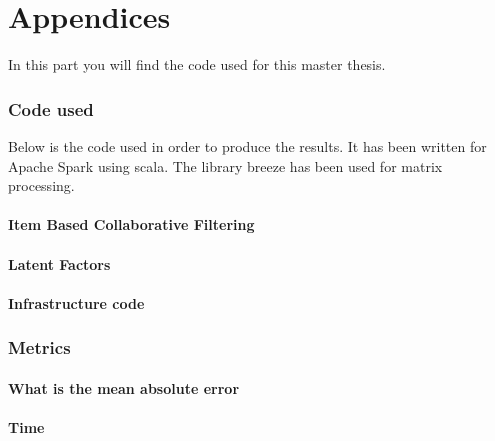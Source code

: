 \newpage
\appendix
\part{Appendices}
In this part you will find the code used for this master thesis.
\section{Code used}
Below is the code used in order to produce the results. It has been 
written for Apache Spark \cite{ApacheSpark:1} using scala. The library breeze has been used for matrix processing.
\subsection{Item Based Collaborative Filtering}

\subsection{Latent Factors}

\subsection{Infrastructure code}


\section{Metrics}
\subsection{What is the mean absolute error}
\subsection{Time}
\listoftables
\newpage
\listoffigures